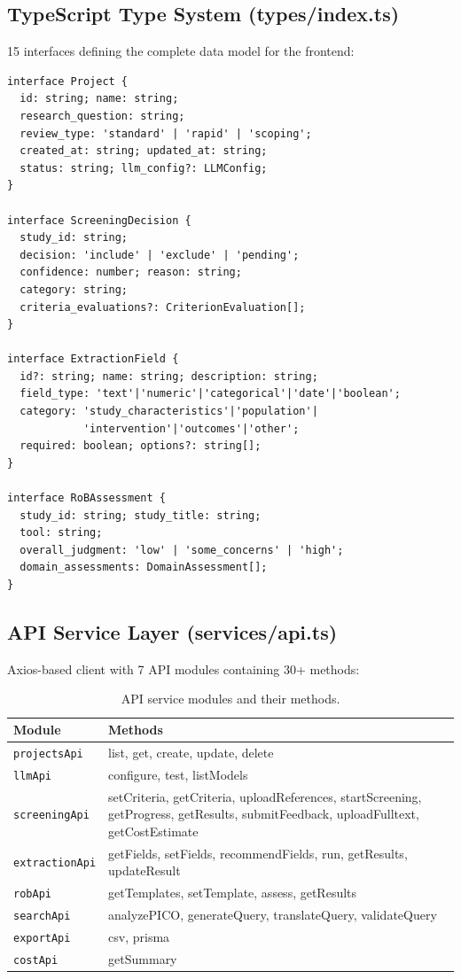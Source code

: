 \documentclass[11pt,a4paper]{article}
\begin{document}
\subsection{TypeScript Type System (types/index.ts)}

15 interfaces defining the complete data model for the frontend:

\begin{lstlisting}[style=typescript, title=Key Type Definitions]
interface Project {
  id: string; name: string;
  research_question: string;
  review_type: 'standard' | 'rapid' | 'scoping';
  created_at: string; updated_at: string;
  status: string; llm_config?: LLMConfig;
}

interface ScreeningDecision {
  study_id: string;
  decision: 'include' | 'exclude' | 'pending';
  confidence: number; reason: string;
  category: string;
  criteria_evaluations?: CriterionEvaluation[];
}

interface ExtractionField {
  id?: string; name: string; description: string;
  field_type: 'text'|'numeric'|'categorical'|'date'|'boolean';
  category: 'study_characteristics'|'population'|
            'intervention'|'outcomes'|'other';
  required: boolean; options?: string[];
}

interface RoBAssessment {
  study_id: string; study_title: string;
  tool: string;
  overall_judgment: 'low' | 'some_concerns' | 'high';
  domain_assessments: DomainAssessment[];
}
\end{lstlisting}

\subsection{API Service Layer (services/api.ts)}

Axios-based client with 7 API modules containing 30+ methods:

\begin{table}[H]
\centering\small
\begin{tabular}{lp{8cm}}
\toprule
\textbf{Module} & \textbf{Methods} \\
\midrule
\texttt{projectsApi} & list, get, create, update, delete \\
\texttt{llmApi} & configure, test, listModels \\
\texttt{screeningApi} & setCriteria, getCriteria, uploadReferences, startScreening, getProgress, getResults, submitFeedback, uploadFulltext, getCostEstimate \\
\texttt{extractionApi} & getFields, setFields, recommendFields, run, getResults, updateResult \\
\texttt{robApi} & getTemplates, setTemplate, assess, getResults \\
\texttt{searchApi} & analyzePICO, generateQuery, translateQuery, validateQuery \\
\texttt{exportApi} & csv, prisma \\
\texttt{costApi} & getSummary \\
\bottomrule
\end{tabular}
\caption{API service modules and their methods.}
\end{table}
\end{document}
